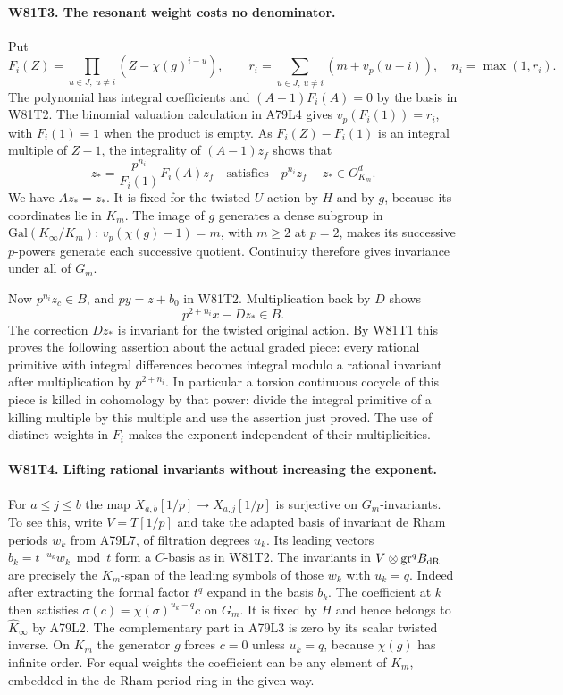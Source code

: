 \paragraph{W81T3. The resonant weight costs no denominator.}
Put
\[
 F_i(Z)=\prod_{u\in J,\ u\ne i}(Z-\chi(g)^{i-u}),\qquad
 r_i=\sum_{u\in J,\ u\ne i}(m+v_p(u-i)),\quad n_i=\max(1,r_i).
\]
The polynomial has integral coefficients and
$(A-1)F_i(A)=0$ by the basis in W81T2. The binomial valuation
calculation in A79L4 gives $v_p(F_i(1))=r_i$, with $F_i(1)=1$
when the product is empty. As $F_i(Z)-F_i(1)$ is an integral
multiple of $Z-1$, the integrality of $(A-1)z_f$ shows that
\[
 z_* = \frac{p^{n_i}}{F_i(1)}F_i(A)z_f
       \quad\text{satisfies}\quad p^{n_i}z_f-z_*\in O_{K_m}^d .
\]
We have $Az_*=z_*$. It is fixed for the twisted $U$-action by $H$
and by $g$, because its coordinates lie in $K_m$. The image of
$g$ generates a dense subgroup in $\mathrm{Gal}(K_\infty/K_m)$:
$v_p(\chi(g)-1)=m$, with $m\ge2$ at $p=2$, makes its successive
$p$-powers generate each successive quotient. Continuity therefore
gives invariance under all of $G_m$.

Now $p^{n_i}z_c\in B$, and $py=z+b_0$ in W81T2. Multiplication
back by $D$ shows
\[
                  p^{2+n_i}x-Dz_*\in B .
\]
The correction $Dz_*$ is invariant for the twisted original action.
By W81T1 this proves the following assertion about the actual
graded piece: every rational primitive with integral differences
becomes integral modulo a rational invariant after multiplication
by $p^{2+n_i}$. In particular a torsion continuous cocycle of
this piece is killed in cohomology by that power: divide the
integral primitive of a killing multiple by this multiple and use
the assertion just proved. The use of distinct weights in $F_i$
makes the exponent independent of their multiplicities.

\paragraph{W81T4. Lifting rational invariants without increasing the exponent.}
For $a\le j\le b$ the map $X_{a,b}[1/p]\to X_{a,j}[1/p]$
is surjective on $G_m$-invariants. To see this, write
$V=T[1/p]$ and take the adapted basis of invariant de Rham periods
$w_k$ from A79L7, of filtration degrees $u_k$. Its leading vectors
$b_k=t^{-u_k}w_k\bmod t$ form a $C$-basis as in W81T2.
The invariants in $V\otimes\mathrm{gr}^q B_{\rm dR}$
are precisely the $K_m$-span of the leading symbols of those
$w_k$ with $u_k=q$. Indeed after extracting the formal factor $t^q$
expand in the basis $b_k$. The coefficient at $k$ then satisfies
$\sigma(c)=\chi(\sigma)^{u_k-q}c$ on $G_m$. It is fixed by $H$
and hence belongs to $\widehat K_\infty$ by A79L2. The complementary
part in A79L3 is zero by its scalar twisted inverse. On $K_m$ the
generator $g$ forces $c=0$ unless $u_k=q$, because $\chi(g)$ has
infinite order. For equal weights the coefficient can be any
element of $K_m$, embedded in the de Rham period ring in the
given way.


